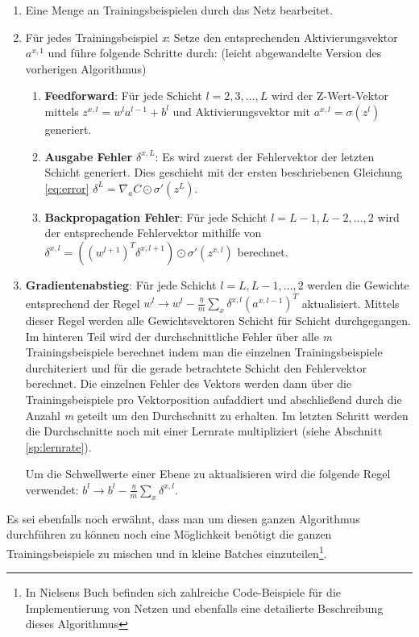 \begin{minipage}{\linewidth}
\begin{enumerate}

\item Eine Menge an Trainingsbeispielen durch das Netz bearbeitet.

\item Für jedes Trainingsbeispiel \emph{x}: Setze den entsprechenden Aktivierungsvektor $a^{x,1}$ und führe folgende Schritte durch: (leicht abgewandelte Version des vorherigen Algorithmus)
\begin{enumerate}

	\item \textbf{Feedforward}: Für jede Schicht $l = 2, 3, \ldots, L$ wird der Z-Wert-Vektor mittels $z^{x,l} = w^l a^{l-1}+b^l$ und Aktivierungsvektor mit $a^{x,l} = \sigma(z^{l})$ generiert.

	\item \textbf{Ausgabe Fehler} $\delta^{x,L}$: Es wird zuerst der Fehlervektor der letzten Schicht generiert. Dies geschieht mit der ersten beschriebenen Gleichung \ref{eq:error} $\delta^{L}  = \nabla_a C \odot \sigma'(z^L)$.

	\item \textbf{Backpropagation Fehler}: Für jede Schicht $l = L-1, L-2, \ldots, 2$ wird der entsprechende Fehlervektor mithilfe von $\delta^{x,l} = ((w^{l+1})^T \delta^{x,l+1}) \odot \sigma'(z^{x,l})$ berechnet.
\end{enumerate}

\item \textbf{Gradientenabstieg}: Für jede Schicht $l = L, L-1, \ldots, 2$ werden die Gewichte entsprechend der Regel $w^l \rightarrow w^l-\frac{\eta}{m} \sum_x \delta^{x,l} (a^{x,l-1})^T$ aktualisiert. Mittels dieser Regel werden alle Gewichtsvektoren Schicht für Schicht durchgegangen. Im hinteren Teil wird der durchschnittliche Fehler über alle \emph{m} Trainingsbeispiele berechnet indem man die einzelnen Trainingsbeispiele durchiteriert und für die gerade betrachtete Schicht den Fehlervektor berechnet. Die einzelnen Fehler des Vektors werden dann über die Trainingsbeispiele pro Vektorposition aufaddiert und abschließend durch die Anzahl \emph{m} geteilt um den Durchschnitt zu erhalten. Im letzten Schritt werden die Durchschnitte noch mit einer Lernrate multipliziert (siehe Abschnitt \ref{sp:lernrate}).

Um die Schwellwerte einer Ebene zu aktualisieren wird die folgende Regel verwendet: $b^l \rightarrow b^l-\frac{\eta}{m} \sum_x \delta^{x,l}$.

\end{enumerate}
\end{minipage}

\bigbreak

Es sei ebenfalls noch erwähnt, dass man um diesen ganzen Algorithmus durchführen zu können noch eine Möglichkeit benötigt die ganzen Trainingsbeispiele zu mischen und in kleine Batches einzuteilen\footnote{In Nielsens Buch \cite{dlnielsen} befinden sich zahlreiche Code-Beispiele für die Implementierung von Netzen und ebenfalls eine detailierte Beschreibung dieses Algorithmus}.
